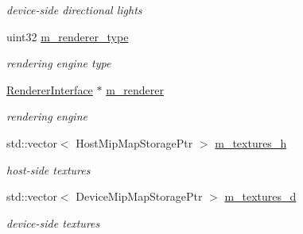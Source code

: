 \begin{DoxyCompactItemize}
\begin{DoxyCompactList}\small\item\em device-\/side directional lights \end{DoxyCompactList}\item 
\mbox{\label{struct_rendering_context_impl_a737fbc51dc349dbc81e3dccae57a2f1d}} 
uint32 \hyperlink{struct_rendering_context_impl_a737fbc51dc349dbc81e3dccae57a2f1d}{m\+\_\+renderer\+\_\+type}
\begin{DoxyCompactList}\small\item\em rendering engine type \end{DoxyCompactList}\item 
\mbox{\label{struct_rendering_context_impl_a58169e24ba86e1c5373af062f1681e89}} 
\hyperlink{struct_renderer_interface}{Renderer\+Interface} $\ast$ \hyperlink{struct_rendering_context_impl_a58169e24ba86e1c5373af062f1681e89}{m\+\_\+renderer}
\begin{DoxyCompactList}\small\item\em rendering engine \end{DoxyCompactList}\item 
\mbox{\label{struct_rendering_context_impl_a85f13da5bca0172ddd9535d811421a35}} 
std\+::vector$<$ Host\+Mip\+Map\+Storage\+Ptr $>$ \hyperlink{struct_rendering_context_impl_a85f13da5bca0172ddd9535d811421a35}{m\+\_\+textures\+\_\+h}
\begin{DoxyCompactList}\small\item\em host-\/side textures \end{DoxyCompactList}\item 
\mbox{\label{struct_rendering_context_impl_a1609a8e3ff5a6d43b90b7b9ac773364b}} 
std\+::vector$<$ Device\+Mip\+Map\+Storage\+Ptr $>$ \hyperlink{struct_rendering_context_impl_a1609a8e3ff5a6d43b90b7b9ac773364b}{m\+\_\+textures\+\_\+d}
\begin{DoxyCompactList}\small\item\em device-\/side textures \end{DoxyCompactList}\item 
\mbox{\label{struct_rendering_context_impl_a390a67d54ac7af5ab7e9d014dafb1c3e}} 

\end{DoxyCompactItemize}
